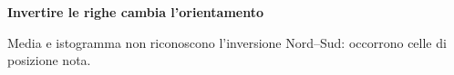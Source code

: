 \documentclass[12pt,aspectratio=1610]{beamer}
\begin{document}
\begin{frame}[plain]\hypertarget{slide11}{}
\begin{lrbox}{\TitleBox}
\begin{minipage}[t]{17.7cm}\raggedright\color{Ink}\fontsize{11.3}{14.8}\selectfont
\color{Navy}\bfseries\fontsize{20.6}{24.5}\selectfont Invertire le righe cambia l’orientamento
\end{minipage}\end{lrbox}

\begin{lrbox}{\RecallBox}
\begin{minipage}[t]{14.3cm}\raggedright\color{Ink}\fontsize{11.3}{14.8}\selectfont
\fontsize{10.3}{13.8}\selectfont Media e istogramma non riconoscono l’inversione Nord–Sud: occorrono celle di posizione nota.
\end{minipage}\end{lrbox}


\end{frame}
\end{document}
